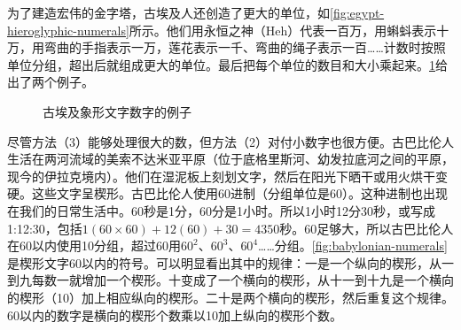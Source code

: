 \documentclass[b5paper]{ctexart}
\begin{document}
为了建造宏伟的金字塔，古埃及人还创造了更大的单位，如\cref{fig:egypt-hieroglyphic-numerals}所示。他们用永恒之神（Heh）代表一百万，用蝌蚪表示十万，用弯曲的手指表示一万，莲花表示一千、弯曲的绳子表示一百……计数时按照单位分组，超出后就组成更大的单位。最后把每个单位的数目和大小乘起来。\cref{fig:egypt-number-examples}给出了两个例子。

\begin{figure}[htbp]
 \centering
 \caption{古埃及象形文字数字的例子}
 \label{fig:egypt-number-examples}
\end{figure}

  
尽管方法（3）能够处理很大的数，但方法（2）对付小数字也很方便。古巴比伦人生活在两河流域的美索不达米亚平原（位于底格里斯河、幼发拉底河之间的平原，现今的伊拉克境内）。他们在湿泥板上刻划文字，然后在阳光下晒干或用火烘干变硬。这些文字呈楔形。古巴比伦人使用60进制（分组单位是60）。这种进制也出现在我们的日常生活中。60秒是1分，60分是1小时。所以1小时12分30秒，或写成1:12:30，包括$1(60\times 60) + 12(60) + 30 = 4350$秒。60足够大，所以古巴比伦人在60以内使用10分组，超过60用$60^2$、$60^3$、$60^4$……分组。\cref{fig:babylonian-numerals}是楔形文字60以内的符号。可以明显看出其中的规律：一是一个纵向的楔形，从一到九每数一就增加一个楔形。十变成了一个横向的楔形，从十一到十九是一个横向的楔形（10）加上相应纵向的楔形。二十是两个横向的楔形，然后重复这个规律。60以内的数字是横向的楔形个数乘以10加上纵向的楔形个数。
\end{document}
